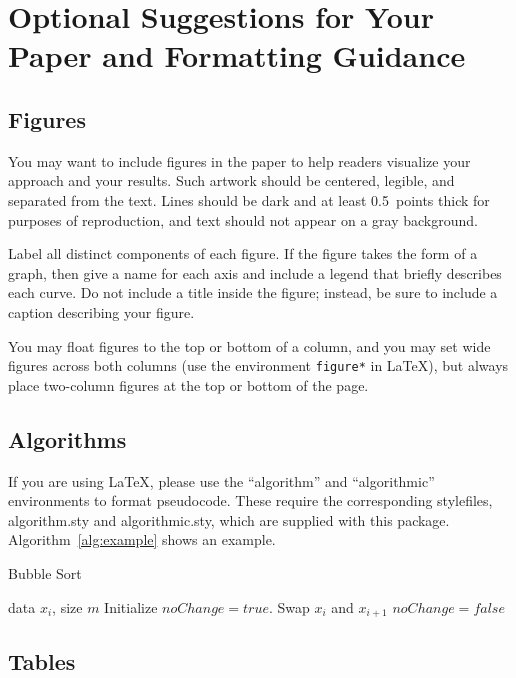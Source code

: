 \documentclass{article}
\begin{document}
\section{Optional Suggestions for Your Paper and Formatting Guidance} 

\subsection{Figures}
 
You may want to include figures in the paper to help readers visualize
your approach and your results. Such artwork should be centered,
legible, and separated from the text. Lines should be dark and at
least 0.5~points thick for purposes of reproduction, and text should
not appear on a gray background.

Label all distinct components of each figure. If the figure takes the
form of a graph, then give a name for each axis and include a legend
that briefly describes each curve. Do not include a title inside the
figure; instead, be sure to include a caption describing your figure.

You may float figures to the top or
bottom of a column, and you may set wide figures across both columns
(use the environment {\tt figure*} in \LaTeX), but always place
two-column figures at the top or bottom of the page.

\subsection{Algorithms}

If you are using \LaTeX, please use the ``algorithm'' and ``algorithmic'' 
environments to format pseudocode. These require 
the corresponding stylefiles, algorithm.sty and 
algorithmic.sty, which are supplied with this package. 
Algorithm~\ref{alg:example} shows an example. 

\begin{algorithm}[tb]
   \caption{Bubble Sort}
   \label{alg:example}
\begin{algorithmic}
    data $x_i$, size $m$
   \REPEAT
   \STATE Initialize $noChange = true$.
   \STATE Swap $x_i$ and $x_{i+1}$
   \STATE $noChange = false$
   \ENDIF
   \ENDFOR
\end{algorithmic}
\end{algorithm}
 
\subsection{Tables} 
 
\end{document}
